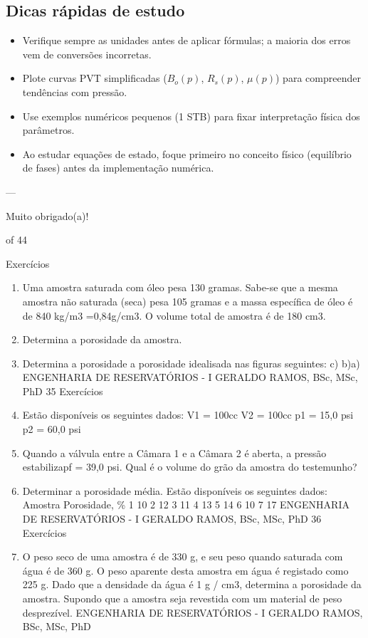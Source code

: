\documentclass[11pt,a4paper]{article}
\begin{document}
\subsection{Dicas rápidas de estudo}
\begin{itemize}
\item Verifique sempre as unidades antes de aplicar fórmulas; a maioria dos erros vem de conversões incorretas.
\item Plote curvas PVT simplificadas ($B_o(p)$, $R_s(p)$, $\mu(p)$) para compreender tendências com pressão.
\item Use exemplos numéricos pequenos (1 STB) para fixar interpretação física dos parâmetros.
\item Ao estudar equações de estado, foque primeiro no conceito físico (equilíbrio de fases) antes da implementação numérica.
\end{itemize}

---

Muito obrigado(a)!






of ⁨44⁩



Exercícios
\begin{enumerate}
\item Uma amostra saturada com óleo pesa 130 gramas. Sabe-se que a mesma amostra não saturada (seca)
pesa 105 gramas e a massa específica de óleo é de 840 kg/m3 =0,84g/cm3. O volume total de amostra
é de 180 cm3.
\item Determina a porosidade da amostra.\n\item Determina a porosidade a porosidade idealisada nas figuras seguintes:
c)
b)a)
ENGENHARIA DE RESERVATÓRIOS - I
GERALDO RAMOS, BSc, MSc, PhD
35
Exercícios
\item Estão disponíveis os seguintes dados:
V1 = 100cc
V2 = 100cc
p1 = 15,0 psi
p2 = 60,0 psi
\item Quando a válvula entre a Câmara 1 e a Câmara 2 é aberta, a pressão estabiliza\nem pf = 39,0 psi. Qual é o volume do grão da amostra do testemunho?
\item Determinar a porosidade média. Estão disponíveis os seguintes dados:
Amostra Porosidade, \%
1 10
2 12
3 11
4 13
5 14
6 10
7 17
ENGENHARIA DE RESERVATÓRIOS - I
GERALDO RAMOS, BSc, MSc, PhD
36
Exercícios
\item O peso seco de uma amostra é de 330 g, e seu peso quando saturada com água é de 360 g. O peso
aparente desta amostra em água é registado como 225 g. Dado que a densidade da água é 1 g / cm3,
determina a porosidade da amostra. Supondo que a amostra seja revestida com um material de peso
desprezível.
ENGENHARIA DE RESERVATÓRIOS - I
GERALDO RAMOS, BSc, MSc, PhD
\end{enumerate}
\end{document}
